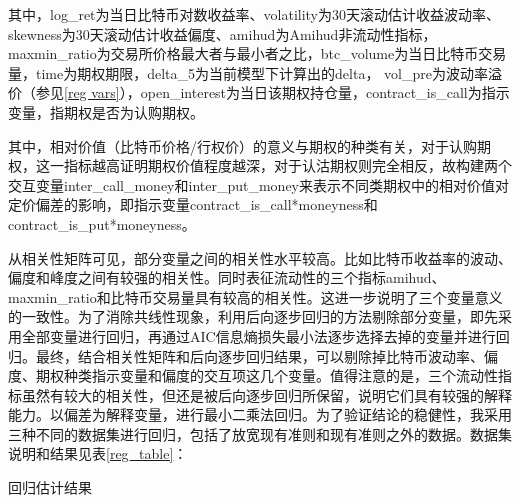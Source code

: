 {\newpage
\restoregeometry
其中，log\_ret为当日比特币对数收益率、volatility为30天滚动估计收益波动率、skewness为30天滚动估计收益偏度、amihud为Amihud非流动性指标，maxmin\_ratio为交易所价格最大者与最小者之比，btc\_volume为当日比特币交易量，time为期权期限，delta\_5为当前模型下计算出的delta，
vol\_pre为波动率溢价（参见\ref{reg vars}），open\_interest为当日该期权持仓量，contract\_is\_call为指示变量，指期权是否为认购期权。
\par{其中，相对价值（比特币价格/行权价）的意义与期权的种类有关，对于认购期权，这一指标越高证明期权价值程度越深，对于认沽期权则完全相反，故构建两个交互变量inter\_call\_money和inter\_put\_money来表示不同类期权中的相对价值对定价偏差的影响，即指示变量contract\_is\_call*moneyness和contract\_is\_put*moneyness。}
\par{从相关性矩阵可见，部分变量之间的相关性水平较高。比如比特币收益率的波动、偏度和峰度之间有较强的相关性。同时表征流动性的三个指标amihud、maxmin\_ratio和比特币交易量具有较高的相关性。这进一步说明了三个变量意义的一致性。为了消除共线性现象，利用后向逐步回归的方法剔除部分变量，即先采用全部变量进行回归，再通过AIC信息熵损失最小法逐步选择去掉的变量并进行回归。最终，结合相关性矩阵和后向逐步回归结果，可以剔除掉比特币波动率、偏度、期权种类指示变量和偏度的交互项这几个变量。值得注意的是，三个流动性指标虽然有较大的相关性，但还是被后向逐步回归所保留，说明它们具有较强的解释能力。以偏差为解释变量，进行最小二乘法回归。为了验证结论的稳健性，我采用三种不同的数据集进行回归，包括了放宽现有准则和现有准则之外的数据。数据集说明和结果见表\ref{reg_table}：}
\newpage
{}
\begin{center}
\begin{threeparttable}[H]

\caption{回归估计结果}
\label{reg_table}



\end{threeparttable}
\end{center}}

